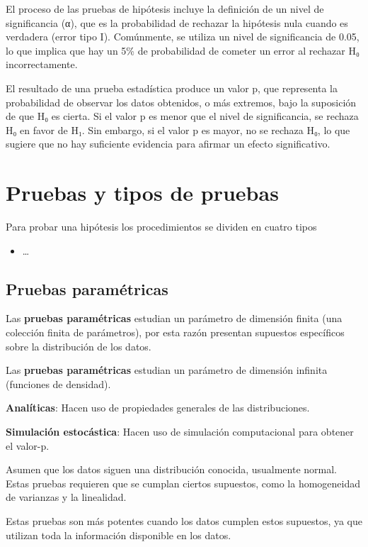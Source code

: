 \documentclass[
  letterpaper,
  DIV=11,
  numbers=noendperiod]{scrreprt}
\providecommand{\tightlist}{%
  \setlength{\itemsep}{0pt}\setlength{\parskip}{0pt}}\usepackage{longtable,booktabs,array}
\begin{document}
El proceso de las pruebas de hipótesis incluye la definición de un nivel
de significancia (α), que es la probabilidad de rechazar la hipótesis
nula cuando es verdadera (error tipo I). Comúnmente, se utiliza un nivel
de significancia de 0.05, lo que implica que hay un 5\% de probabilidad
de cometer un error al rechazar H₀ incorrectamente.

El resultado de una prueba estadística produce un valor p, que
representa la probabilidad de observar los datos obtenidos, o más
extremos, bajo la suposición de que H₀ es cierta. Si el valor p es menor
que el nivel de significancia, se rechaza H₀ en favor de H₁. Sin
embargo, si el valor p es mayor, no se rechaza H₀, lo que sugiere que no
hay suficiente evidencia para afirmar un efecto significativo.

\chapter{Pruebas y tipos de pruebas}\label{pruebas-y-tipos-de-pruebas}

Para probar una hipótesis los procedimientos se dividen en cuatro tipos

\begin{itemize}
\tightlist
\item
  \ldots{}
\end{itemize}

\section{Pruebas paramétricas}\label{pruebas-paramuxe9tricas}

Las \textbf{pruebas paramétricas} estudian un parámetro de dimensión
finita (una colección finita de parámetros), por esta razón presentan
supuestos específicos sobre la distribución de los datos.

Las \textbf{pruebas paramétricas} estudian un parámetro de dimensión
infinita (funciones de densidad).

\textbf{Analíticas}: Hacen uso de propiedades generales de las
distribuciones.

\textbf{Simulación estocástica}: Hacen uso de simulación computacional
para obtener el valor-p.

Asumen que los datos siguen una distribución conocida, usualmente
normal. Estas pruebas requieren que se cumplan ciertos supuestos, como
la homogeneidad de varianzas y la linealidad.

Estas pruebas son más potentes cuando los datos cumplen estos supuestos,
ya que utilizan toda la información disponible en los datos.
\end{document}
